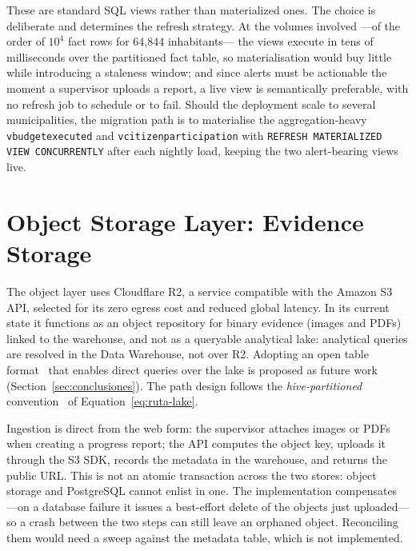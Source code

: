 \documentclass[runningheads]{llncs}
\renewcommand{\_}{\origunderscore\allowbreak}
\begin{document}
\begingroup
These are standard SQL views rather than materialized ones. The choice is deliberate and determines the refresh strategy. At the volumes involved ---of the order of $10^4$ fact rows for 64,844 inhabitants--- the views execute in tens of milliseconds over the partitioned fact table, so materialisation would buy little while introducing a staleness window; and since alerts must be actionable the moment a supervisor uploads a report, a live view is semantically preferable, with no refresh job to schedule or to fail. Should the deployment scale to several municipalities, the migration path is to materialise the aggregation-heavy \texttt{v\_budget\_executed} and \texttt{v\_citizen\_participation} with \texttt{REFRESH MATERIALIZED VIEW CONCURRENTLY} after each nightly load, keeping the two alert-bearing views live.
\endgroup

\section{Object Storage Layer: Evidence Storage}
\label{sec:datalake}

The object layer uses Cloudflare R2, a service compatible with the Amazon S3 API, selected for its zero egress cost and reduced global latency. In its current state it functions as an object repository for binary evidence (images and PDFs) linked to the warehouse, and not as a queryable analytical lake: analytical queries are resolved in the Data Warehouse, not over R2. Adopting an open table format~\cite{Armbrust2020} that enables direct queries over the lake is proposed as future work (Section~\ref{sec:conclusiones}). The path design follows the \textit{hive-partitioned} convention~\cite{Palkar2021} of Equation~\eqref{eq:ruta-lake}.

Ingestion is direct from the web form: the supervisor attaches images or PDFs when creating a progress report; the API computes the object key, uploads it through the S3 SDK, records the metadata in the warehouse, and returns the public URL. This is not an atomic transaction across the two stores: object storage and PostgreSQL cannot enlist in one. The implementation compensates ---on a database failure it issues a best-effort delete of the objects just uploaded--- so a crash between the two steps can still leave an orphaned object. Reconciling them would need a sweep against the metadata table, which is not implemented.

\end{document}
